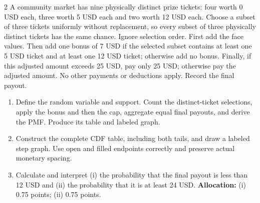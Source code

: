 \begin{multicols*}{2}
A community market has nine physically distinct prize tickets: four worth 0 USD each, three worth 5 USD each and two worth 12 USD each. Choose a subset of three tickets uniformly without replacement, so every subset of three physically distinct tickets has the same chance. Ignore selection order. First add the face values. Then add one bonus of 7 USD if the selected subset contains at least one 5 USD ticket and at least one 12 USD ticket; otherwise add no bonus. Finally, if this adjusted amount exceeds 25 USD, pay only 25 USD; otherwise pay the adjusted amount. No other payments or deductions apply. Record the final payout.

\begin{enumerate}[label=(\alph*)]
\item Define the random variable and support. Count the distinct-ticket selections, apply the bonus and then the cap, aggregate equal final payouts, and derive the PMF. Produce its table and labeled graph. 
\item Construct the complete CDF table, including both tails, and draw a labeled step graph. Use open and filled endpoints correctly and preserve actual monetary spacing. 
\item Calculate and interpret (i) the probability that the final payout is less than 12 USD and (ii) the probability that it is at least 24 USD. 
\textbf{Allocation:} (i) 0.75 points; (ii) 0.75 points.
\end{enumerate}
\end{multicols*}

